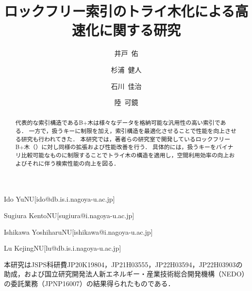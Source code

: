 \documentclass[
  submit,
  techrep,
  noauthor,
  a4paper,
  notitlepage,
  ja=standard,
  autodetect-engine,
  dvi=dvipdfmx
]{ipsj}
\begin{document}
\title{ロックフリー索引のトライ木化による高速化に関する研究}


\author{井戸~佑}{Ido Yu}{NU}[ido@db.is.i.nagoya-u.ac.jp]
\author{杉浦~健人}{Sugiura Kento}{NU}[sugiura@i.nagoya-u.ac.jp]
\author{石川~佳治}{Ishikawa Yoshiharu}{NU}[ishikawa@i.nagoya-u.ac.jp]
\author{陸~可鏡}{Lu Kejing}{NU}[lu@db.is.i.nagoya-u.ac.jp]

\begin{abstract}
  代表的な索引構造であるB+木は様々なデータを格納可能な汎用性の高い索引である．
  一方で，扱うキーに制限を加え，索引構造を最適化させることで性能を向上させる研究も行われてきた．
  本研究では，著者らの研究室で開発しているロックフリーB+木（\Bctree{}）に対し同様の拡張および性能改善を行う．
  具体的には，扱うキーをバイナリ比較可能なものに制限することでトライ木の構造を適用し，空間利用効率の向上およびそれに伴う検索性能の向上を図る．
\end{abstract}

\maketitle



\begin{acknowledgment}
  本研究はJSPS科研費JP20K19804，JP21H03555，JP22H03594，JP22H03903の助成，および国立研究開発法人新エネルギー・産業技術総合開発機構（NEDO）の委託業務（JPNP16007）の結果得られたものである．
\end{acknowledgment}



\end{document}
